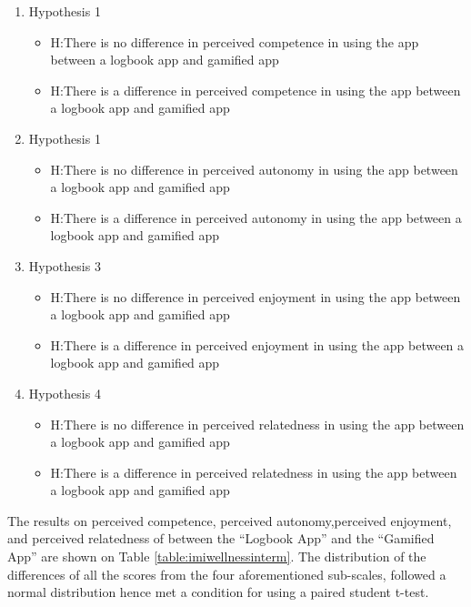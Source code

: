 \begin{enumerate}
\item{Hypothesis 1}
\begin{itemize}
\item{H}:There is no difference in perceived competence in using the app between a logbook app and gamified app
\item{H}:There is a difference in perceived competence in using the app between a logbook app and gamified app
\end{itemize}
\item{Hypothesis 1}
\begin{itemize}
\item{H}:There is no difference in perceived autonomy in using the app between a logbook app and gamified app
\item{H}:There is a difference in perceived autonomy in using the app between a logbook app and gamified app
\end{itemize}
\item{Hypothesis 3}
\begin{itemize}
\item{H}:There is no difference in perceived enjoyment in using the app between a logbook app and gamified app
\item{H}:There is a difference in perceived enjoyment in using the app between a logbook app and gamified app
\end{itemize}
\item{Hypothesis 4}
\begin{itemize}
\item{H}:There is no difference in perceived relatedness in using the app between a logbook app and gamified app
\item{H}:There is a difference in perceived relatedness in using the app between a logbook app and gamified app
\end{itemize}
\end{enumerate}
The results on perceived competence, perceived autonomy,perceived enjoyment, and perceived relatedness of between the ``Logbook App''  and the ``Gamified App'' are shown on Table \ref{table:imiwellnessinterm}. The distribution of the differences of all the scores from the four aforementioned sub-scales, followed a normal distribution hence met a condition for using a paired student t-test.\newline
